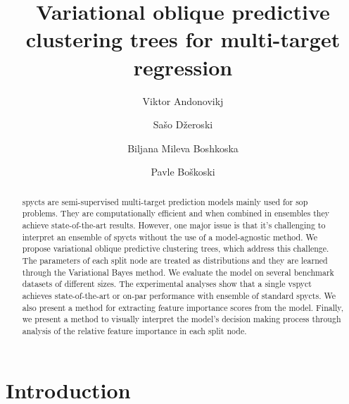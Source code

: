\documentclass[3p,review,authoryear]{elsarticle}
\begin{document}
\begin{frontmatter}
	\title{Variational oblique predictive clustering trees for multi-target regression}
	\author[1,2]{Viktor Andonovikj}
	\author[1]{Sašo Džeroski}
	\author[1,3]{Biljana Mileva Boshkoska}
	\author[1]{Pavle Boškoski}
	\address[1]{Jožef Stefan Institute, Jamova cesta 39, 1000 Ljubljana, Slovenia}
	\address[2]{Jožef Stefan International Postgraduate School, Jamova cesta 39, 1000 Ljubljana, Slovenia}
	\address[3]{Faculty of Information Studies in Novo mesto, Ljubljanska cesta 31b, 8000 Novo mesto, Slovenia}
\begin{abstract}

\Glspl{spyct} are semi-supervised multi-target prediction models mainly used for \gls{sop} problems.
They are computationally efficient and when combined in ensembles they achieve state-of-the-art results.
However, one major issue is that it's challenging to interpret an ensemble of \glspl{spyct} without the use of a model-agnostic method.
We propose variational oblique predictive clustering trees, which address this challenge.
The parameters of each split node are treated as distributions and they are learned through the Variational Bayes method. We evaluate the model on several benchmark datasets of different sizes.
The experimental analyses show that a single \gls{vspyct} achieves state-of-the-art or on-par performance with ensemble of standard \glspl{spyct}. We also present a method for extracting feature importance scores from the model.
Finally, we present a method to visually interpret the model's decision making process through analysis of the relative feature importance in each split node.
\end{abstract}
\end{frontmatter}
\glsresetall

\section{Introduction}
\end{document}
